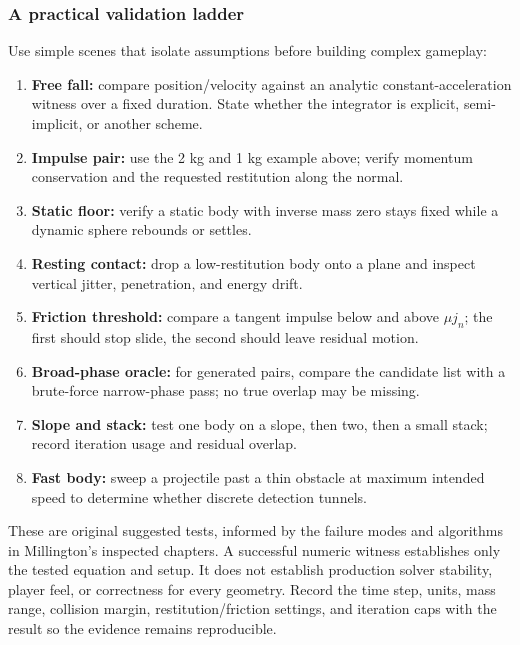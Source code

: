 \subsubsection{A practical validation ladder}\label{06-engine-ii-ch033-a-practical-validation-ladder}

\hypertarget{06-engine-ii-ch033-a-practical-validation-ladder}{}

Use simple scenes that isolate assumptions before building complex gameplay:

\begin{enumerate}
\def\labelenumi{\arabic{enumi}.}
\tightlist
\item
  \textbf{Free fall:} compare position/velocity against an analytic constant-acceleration witness over a fixed duration. State whether the integrator is explicit, semi-implicit, or another scheme.
\item
  \textbf{Impulse pair:} use the 2 kg and 1 kg example above; verify momentum conservation and the requested restitution along the normal.
\item
  \textbf{Static floor:} verify a static body with inverse mass zero stays fixed while a dynamic sphere rebounds or settles.
\item
  \textbf{Resting contact:} drop a low-restitution body onto a plane and inspect vertical jitter, penetration, and energy drift.
\item
  \textbf{Friction threshold:} compare a tangent impulse below and above \(\mu j_n\); the first should stop slide, the second should leave residual motion.
\item
  \textbf{Broad-phase oracle:} for generated pairs, compare the candidate list with a brute-force narrow-phase pass; no true overlap may be missing.
\item
  \textbf{Slope and stack:} test one body on a slope, then two, then a small stack; record iteration usage and residual overlap.
\item
  \textbf{Fast body:} sweep a projectile past a thin obstacle at maximum intended speed to determine whether discrete detection tunnels.
\end{enumerate}

These are original suggested tests, informed by the failure modes and algorithms in Millington's inspected chapters. A successful numeric witness establishes only the tested equation and setup. It does not establish production solver stability, player feel, or correctness for every geometry. Record the time step, units, mass range, collision margin, restitution/friction settings, and iteration caps with the result so the evidence remains reproducible.

